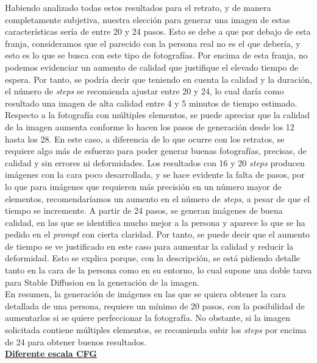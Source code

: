 Habiendo analizado todas estos resultados para el retrato, y de manera completamente subjetiva, nuestra elección para generar una imagen de estas características sería de entre 20 y 24 pasos. Esto se debe a que por debajo de esta franja, consideramos que el parecido con la persona real no es el que debería, y esto es lo que se busca con este tipo de fotografías. Por encima de esta franja, no podemos evidenciar un aumento de calidad que justifique el elevado tiempo de espera. Por tanto, se podría decir que teniendo en cuenta la calidad y la duración, el número de \textit{steps} se recomienda ajustar entre 20 y 24, lo cual daría como resultado una imagen de alta calidad entre 4 y 5 minutos de tiempo estimado.\\

Respecto a la fotografía con múltiples elementos, se puede apreciar que la calidad de la imagen aumenta conforme lo hacen los pasos de generación desde los 12 hasta los 28. En este caso, a diferencia de lo que ocurre con los retratos, se requiere algo más de esfuerzo para poder generar buenas fotografías, precisas, de calidad y sin errores ni deformidades. Los resultados con 16 y 20 \textit{steps} producen imágenes con la cara poco desarrollada, y se hace evidente la falta de pasos, por lo que para imágenes que requieren más precisión en un número mayor de elementos, recomendaríamos un aumento en el número de \textit{steps}, a pesar de que el tiempo se incremente. A partir de 24 pasos, se generan imágenes de buena calidad, en las que se identifica mucho mejor a la persona y aparece lo que se ha pedido en el \textit{prompt} con cierta claridad. Por tanto, se puede decir que el aumento de tiempo se ve justificado en este caso para aumentar la calidad y reducir la deformidad. Esto se explica porque, con la descripción, se está pidiendo detalle tanto en la cara de la persona como en su entorno, lo cual supone una doble tarea para Stable Diffusion en la generación de la imagen. \\


En resumen, la generación de imágenes en las que se quiera obtener la cara detallada de una persona, requiere un mínimo de 20 pasos, con la posibilidad de aumentarlos si se quiere perfeccionar la fotografía. No obstante, si la imagen solicitada contiene múltiples elementos, se recomienda subir los \textit{steps} por encima de 24 para obtener buenos resultados.\\

\textbf{\underline{Diferente escala CFG}}

